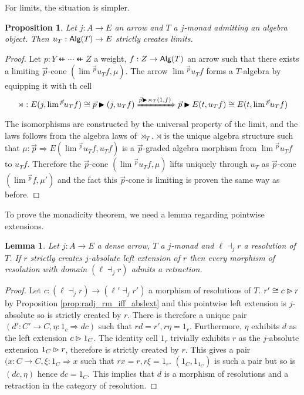 \documentclass[10pt,a4paper]{article}
\newcommand{\cat}[1]{\textcat{#1}}
\newcommand{\textcat}[1]{{\normalfont\textsf{#1}}}
\newcommand{\To}{\Rightarrow}
\newcommand{\dfrom}{\nvleftarrow}
\newcommand{\plext}{\mathbin{{\rhd}\mathclap{\mspace{-17.5mu}\cdot}}}
\newcommand{\rext}{\mathbin{\blacktriangleright}}
\newcommand{\simeqq}{\cong}
\DeclareMathOperator{\Alg}{\cat{Alg}}
\theoremstyle{plain}
\newtheorem{proposition}[theorem]{Proposition}
\newtheorem{lemma}[theorem]{Lemma}
\theoremstyle{definition}
\theoremstyle{remark}
\begin{document}
For limits, the situation is simpler.

\begin{proposition}
    \label{prop:uT_create_lim}
    Let $j : A\to E$ an arrow and $T$ a $j$-monad admitting an algebra object. Then $u_T : \Alg(T) \to E$ strictly creates limits.
\end{proposition}

\begin{proof}
    Let $p : Y \dfrom \cdots \dfrom Z$ a weight, $f : Z \to \Alg(T)$ an arrow such that there exists a limiting $\vec p$-cone $(\lim{}^{\vec p}u_Tf, \mu)$. The arrow $\lim{}^{\vec p}u_Tf$ forms a $T$-algebra by equipping it with th cell
    $$\rtimes: E(j, \lim{}^{\vec p}u_Tf) \simeqq \vec p\rext (j, u_Tf) \xRightarrow[]{\vec p \rext \rtimes_T(1, f)} \vec p\rext E(t, u_Tf) \simeqq E(t, \lim{}^{\vec p}u_Tf)$$
    The isomorphisms are constructed by the universal property of the limit, and the laws follows from the algebra laws of $\rtimes_T$. $\rtimes$ is the unique algebra structure such that $\mu : \vec p \To E(\lim{}^{\vec p}u_Tf, u_Tf)$ is a $\vec p$-graded algebra morphism from $\lim{}^{\vec p}u_Tf$ to $u_Tf$. Therefore the $\vec p$-cone $(\lim{}^{\vec p}u_Tf, \mu)$ lifts uniquely through $u_T$ as $\vec p$-cone $(\lim{}^{\vec p}f, \mu')$ and the fact this $\vec p$-cone is limiting is proven the same way as before.
\end{proof}

To prove the monadicity theorem, we need a lemma regarding pointwise extensions.

\begin{lemma}
    \label{lem:plext_res_retract}
    Let $j : A\to E$ a dense arrow, $T$ a $j$-monad and $\ell\dashv_jr$ a resolution of $T$. If $r$ strictly creates $j$-absolute left extension of $r$ then every morphism of resolution with domain $(\ell\dashv_jr)$ admits a retraction.
\end{lemma}

\begin{proof}
    Let $c : (\ell\dashv_jr) \to (\ell'\dashv_jr')$ a morphism of resolutions of $T$. $r' \simeqq c\plext r$ by Proposition \ref{prop:radj_rm_iff_abslext} and this pointwise left extension is $j$-absolute so is strictly created by $r$. There is therefore a unique pair $(d' : C' \to C, \eta : 1_c\To dc)$ such that $rd=r', r\eta=1_r$. Furthermore, $\eta$ exhibits $d$ as the left extension $c\plext 1_C$. The identity cell $1_r$ trivially exhibits $r$ as the $j$-absolute extension $1_C\plext r$, therefore is strictly created by $r$. This gives a pair $(x : C \to C, \xi : 1_C\To x$ such that $rx=r, r\xi=1_r$. $(1_C, 1_{1_C})$ is such a pair but so is $(dc, \eta)$ hence $dc = 1_C$. This implies that $d$ is a morphism of resolutions and a retraction in the category of resolution.
\end{proof}
\end{document}
